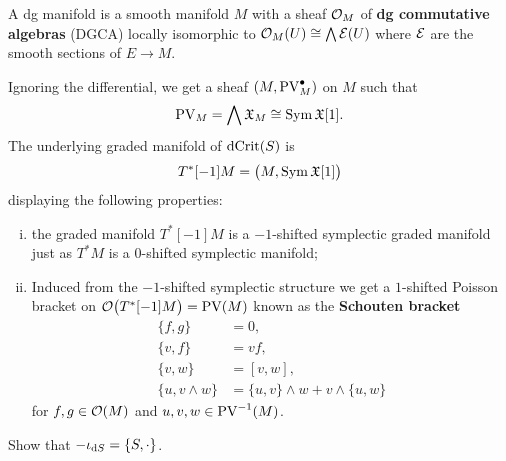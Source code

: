 \begin{definition}
  A dg manifold is a smooth manifold $M$ with a sheaf $\mathcal{O}_M$ of \textbf{dg commutative algebras} (DGCA) locally isomorphic to $\mathcal{O}_M(U) \cong \bigwedge \mathcal{E} (U)$ where $\mathcal{E}$ are the smooth sections of $E \rightarrow M$.
\end{definition}

Ignoring the differential, we get a sheaf $(M, \operatorname{PV}_M^\bullet)$ on $M$ such that
\begin{equation*}
  \operatorname{PV}_M = \bigwedge \mathfrak{X}_M \cong \operatorname{Sym} \mathfrak{X}[1].
\end{equation*}
The underlying graded manifold of $\operatorname{dCrit}(S)$ is
\begin{equation*}
  T^*[-1]M = \bigl( M, \operatorname{Sym} \mathfrak{X}[1] \bigr)
\end{equation*}
displaying the following properties:
\begin{enumerate}[i)]
  \item the graded manifold $T^*[-1]M$ is a $-1$-shifted symplectic graded manifold just as $T^*M$ is a $0$-shifted symplectic manifold;
  \item Induced from the $-1$-shifted symplectic structure we get a $1$-shifted Poisson bracket on $\mathcal{O} \bigl( T^* [-1] M \bigr) = \operatorname{PV}(M)$ known as the \textbf{Schouten bracket}
  \begin{align*}
    \{ f, g \} &= 0, \\
    \{v, f \} &= v f, \\
    \{ v, w \} &= [v, w], \\
    \{u, v \wedge w \} &= \{u, v\} \wedge w + v \wedge \{ u, w \}
  \end{align*}
for $f, g \in \mathcal{O}(M)$ and $u, v, w \in \operatorname{PV}^{-1}(M)$.
\end{enumerate}

\begin{exercise}
  Show that $-\iota_{\mathrm{d} S} = \{ S, \cdot \}$.
\end{exercise}

